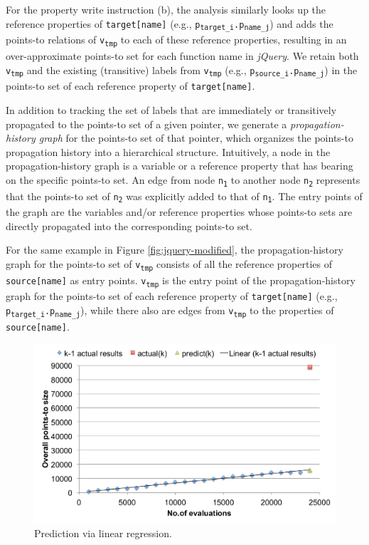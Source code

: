 For the property write instruction (b), the analysis similarly looks up the reference properties of {\tt target[name]} (e.g., {\tt p\textsubscript{target\_i}.p\textsubscript{name\_j}}) and adds the points-to relations of {\tt v\textsubscript{tmp}} to each of these reference properties, resulting in an over-approximate points-to set for each function name in {\it jQuery}. We retain both {\tt v\textsubscript{tmp}} and the existing (transitive) labels from {\tt v\textsubscript{tmp}} (e.g., {\tt p\textsubscript{source\_i}.p\textsubscript{name\_j}}) in the points-to set of each reference property of {\tt target[name]}.

In addition to tracking the set of labels that are immediately or transitively propagated to the points-to set of a given pointer, we generate a {\it propagation-history graph} for the points-to set of that pointer, which organizes the points-to propagation history into a hierarchical structure. Intuitively, a node in the propagation-history graph is a variable or a reference property that has bearing on the specific points-to set. An edge from node {\tt n\textsubscript{1}} to another node {\tt n\textsubscript{2}} represents that the points-to set of {\tt n\textsubscript{2}} was explicitly added to that of {\tt n\textsubscript{1}}. The entry points of the graph are the variables and/or reference properties whose points-to sets are directly propagated into the corresponding points-to set. 

For the same example in Figure \ref{fig:jquery-modified}, the propagation-history graph for the points-to set of {\tt v\textsubscript{tmp}} consists of all the reference properties of {\tt source[name]} as entry points. {\tt v\textsubscript{tmp}} is the entry point of the propagation-history graph for the points-to set of each reference property of {\tt target[name]} (e.g., {\tt p\textsubscript{target\_i}.p\textsubscript{name\_j}}), while there also are edges from {\tt v\textsubscript{tmp}} to the properties of {\tt source[name]}.

\begin{figure}[th!]
        \includegraphics[width=\columnwidth]{linear}
\caption{\textmd{Prediction via linear regression.}}
\label{fig:linear}
\end{figure}

